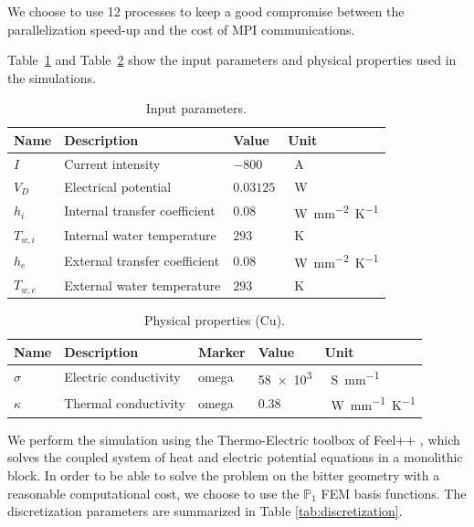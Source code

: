 \documentclass[12pt]{article}
\begin{document}
We choose to use 12 processes to keep a good compromise between the parallelization
speed-up and the cost of MPI communications.

Table~\ref{tab:input_parameters} and Table~\ref{tab:physical_properties} show the
input parameters and physical properties used in the simulations.

\begin{table}[H]
  \centering
  \renewcommand{\arraystretch}{1.5} %
  \begin{tabular}{p{1cm}p{6cm}p{2cm}p{2cm}}
    \toprule
    \textbf{Name} & \textbf{Description} & \textbf{Value} & \textbf{Unit} \\
    \midrule
    $I$ & Current intensity & $-800$ & \SI{}{\ampere} \\
    $V_D$ & Electrical potential & $0.03125$ & \SI{}{\watt} \\
    $h_i$ & Internal transfer coefficient & $0.08$ & \SI{}{\watt mm^{-2} \kelvin^{-1}}  \\
    $T_{w,i}$ & Internal water temperature & $293$ & \SI{}{\kelvin} \\
    $h_e$ & External transfer coefficient & $0.08$ & \SI{}{\watt mm^{-2} \kelvin^{-1}} \\
    $T_{w,e}$ & External water temperature & $293$ & \SI{}{\kelvin} \\
    \bottomrule
  \end{tabular}
  \caption{Input parameters.}
  \label{tab:input_parameters}
\end{table}

\begin{table}[H]
  \centering
  \renewcommand{\arraystretch}{1.5} %
  \begin{tabular}{p{1cm}p{5cm}p{3cm}p{2cm}p{2cm}}
    \toprule
    \textbf{Name} & \textbf{Description} & \textbf{Marker} & \textbf{Value} & \textbf{Unit} \\
    \midrule
    $\sigma$ & Electric conductivity & omega & \SI{58e3}{} & \SI{}{\siemens mm^{-1}} \\
    $\kappa$ & Thermal conductivity & omega & $0.38$ & \SI{}{\watt mm^{-1} \kelvin^{-1}} \\
    \bottomrule
  \end{tabular}
  \caption{Physical properties (Cu).}
  \label{tab:physical_properties}
\end{table}

We perform the simulation using the Thermo-Electric toolbox of Feel++
\cite{christophe_prudhomme_feelppfeelpp_2024}, which solves the coupled system of
heat and electric potential equations in a monolithic block.
In order to be able to solve the problem on the bitter geometry
with a reasonable computational cost, we choose to use the $\mathbb{P}_1$ FEM
basis functions. The discretization parameters are summarized in Table \ref{tab:discretization}.
\end{document}
